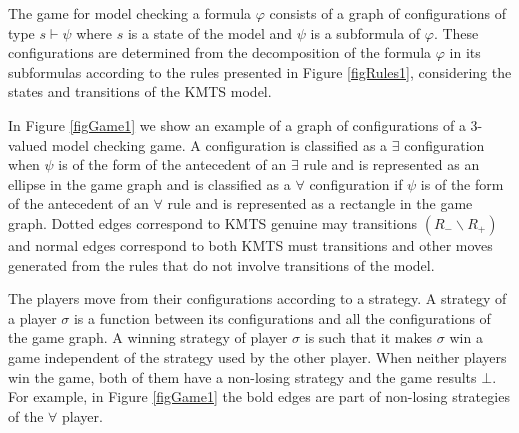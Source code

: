 \documentclass{llncs}
\begin{document}
The game for model checking a formula $\varphi$ consists of a graph of configurations of type $s \vdash \psi$ where $s$ is a state of the model and $\psi$ is a subformula of $\varphi$. These configurations are determined from the decomposition of the formula $\varphi$ in its subformulas according to the rules presented in Figure \ref{figRules1}, considering the states and transitions of the KMTS model. 

In Figure \ref{figGame1} we show an example of a graph of configurations of a 3-valued model checking game. A configuration is classified as a $\exists$ configuration when $\psi$ is of the form of the antecedent of an $\exists$ rule and is represented as an ellipse in the game graph and is classified as a $\forall$ configuration if $\psi$ is of the form of the antecedent of an $\forall$ rule and is represented as a rectangle in the game graph. Dotted edges correspond to KMTS genuine may transitions $(R_{-} \backslash R_{+})$ and normal edges correspond to both KMTS must transitions and other moves generated from the rules that do not involve transitions of the model.

The players move from their configurations according to a strategy. A strategy of a player $\sigma$ is a function between its configurations and all the configurations of the game graph. A winning strategy of player $\sigma$ is such that it makes $\sigma$ win a game independent of the strategy used by the other player.  When neither players win the game, both of them have a non-losing strategy and the game results $\bot$. For example, in Figure \ref{figGame1} the bold edges are part of non-losing strategies of the $\forall$ player.  
\end{document}
